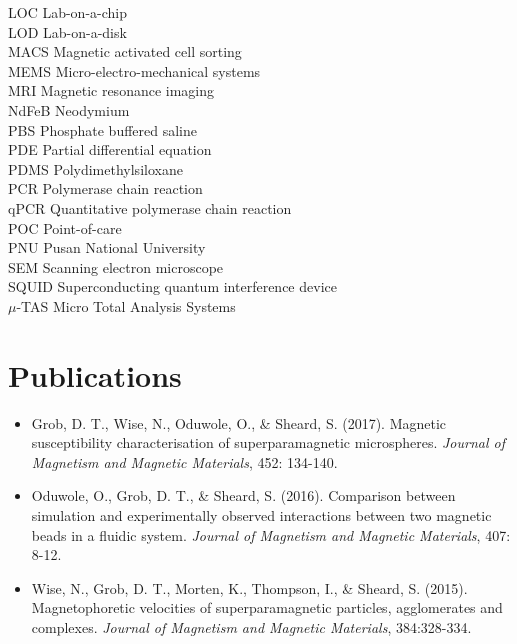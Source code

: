 \begin{tabbing}
 LOC \> Lab-on-a-chip \\[0.5ex]
 LOD \> Lab-on-a-disk \\[0.5ex]
 MACS \> Magnetic activated cell sorting \\[0.5ex]
 MEMS \> Micro-electro-mechanical systems \\[0.5ex]
 MRI \> Magnetic resonance imaging \\[0.5ex]
 NdFeB \> Neodymium \\[0.5ex]
 PBS \> Phosphate buffered saline \\[0.5ex]
 PDE \> Partial differential equation \\[0.5ex]
 PDMS \> Polydimethylsiloxane \\[0.5ex]
 PCR \> Polymerase chain reaction \\[0.5ex]
 qPCR \> Quantitative polymerase chain reaction \\[0.5ex]
 POC \> Point-of-care \\[0.5ex]
 PNU \> Pusan National University \\[0.5ex] 
 SEM \> Scanning electron microscope \\[0.5ex]
 SQUID \> Superconducting quantum interference device \\[0.5ex]
 $\mu$-TAS \> Micro Total Analysis Systems
\end{tabbing}

\cleardoublepage


\chapter*{Publications}\label{chap:publications}
 
\begin{itemize}
  \item[] Grob, D. T., Wise, N., Oduwole, O., \& Sheard, S. (2017). Magnetic susceptibility characterisation of superparamagnetic microspheres. \textit{Journal of Magnetism and Magnetic Materials}, 452: 134-140.

  \item[] Oduwole, O., Grob, D. T., \& Sheard, S. (2016). Comparison between simulation and experimentally observed interactions between two magnetic beads in a fluidic system. \textit{Journal of Magnetism and Magnetic Materials}, 407: 8-12.
  
  \item[] Wise, N., Grob, D. T., Morten, K., Thompson, I., \& Sheard, S. (2015). Magnetophoretic velocities of superparamagnetic particles, agglomerates and complexes. \textit{Journal of Magnetism and Magnetic Materials}, 384:328-334.

\end{itemize}


\cleardoublepage

